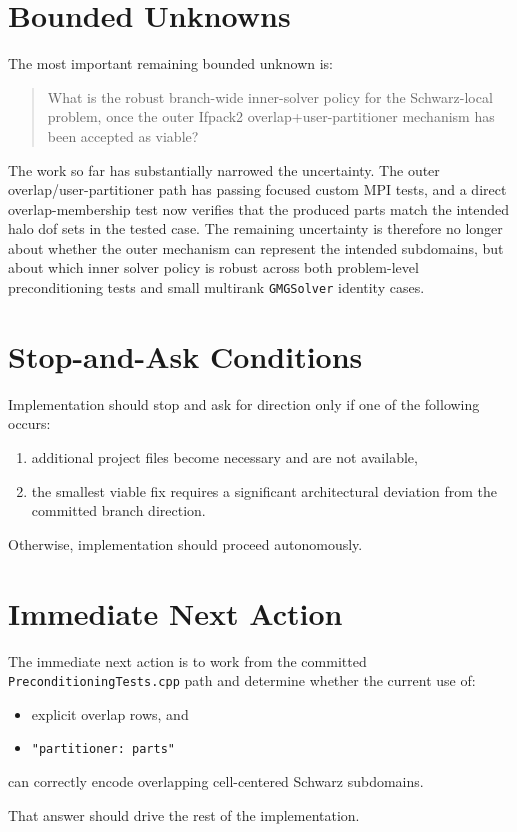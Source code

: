 \documentclass[11pt]{article}
\begin{document}
\section{Bounded Unknowns}
The most important remaining bounded unknown is:
\begin{quote}
What is the robust branch-wide inner-solver policy for the Schwarz-local problem, once the outer Ifpack2 overlap+user-partitioner mechanism has been accepted as viable?
\end{quote}

The work so far has substantially narrowed the uncertainty. The outer overlap/user-partitioner path has passing focused custom MPI tests, and a direct overlap-membership test now verifies that the produced parts match the intended halo dof sets in the tested case. The remaining uncertainty is therefore no longer about whether the outer mechanism can represent the intended subdomains, but about which inner solver policy is robust across both problem-level preconditioning tests and small multirank \texttt{GMGSolver} identity cases.

\section{Stop-and-Ask Conditions}
Implementation should stop and ask for direction only if one of the following occurs:
\begin{enumerate}
  \item additional project files become necessary and are not available,
  \item the smallest viable fix requires a significant architectural deviation from the committed branch direction.
\end{enumerate}

Otherwise, implementation should proceed autonomously.

\section{Immediate Next Action}
The immediate next action is to work from the committed \texttt{PreconditioningTests.cpp} path and determine whether the current use of:
\begin{itemize}
  \item explicit overlap rows, and
  \item \texttt{"partitioner: parts"}
\end{itemize}
can correctly encode overlapping cell-centered Schwarz subdomains.

That answer should drive the rest of the implementation.
\end{document}
